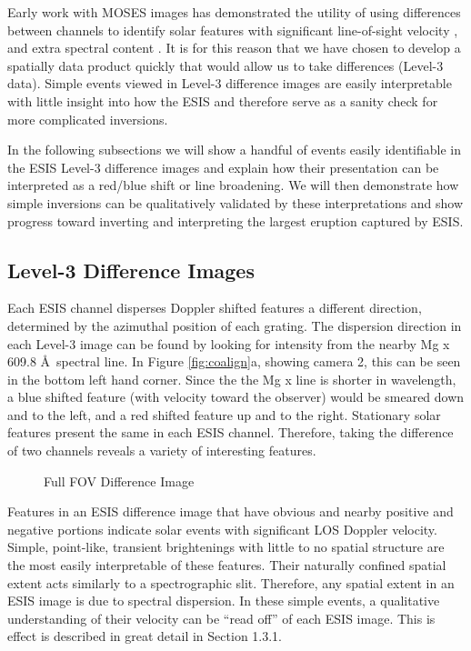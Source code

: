 	Early work with MOSES images has demonstrated the utility of using differences between channels to identify solar features with significant line-of-sight velocity \citep{Fox2010,FoxPhD,RustPhD,Rust2019}, and extra spectral content \citep{RustPhD, Rust2019,Parker2021}.  
	It is for this reason that we have chosen to develop a spatially data product quickly that would allow us to take differences (Level-3 data).  
	Simple events viewed in Level-3 difference images are easily interpretable with little insight into how the ESIS and therefore serve as a sanity check for more complicated inversions. 
	
	In the following subsections we will show a handful of events easily identifiable in the ESIS Level-3 difference images and explain how their presentation can be interpreted as a red/blue shift or line broadening.  
	We will then demonstrate how simple inversions can be qualitatively validated by these interpretations and show progress toward inverting and interpreting the largest eruption captured by ESIS.
	
    \subsection{Level-3 Difference Images}
    
    	Each ESIS channel disperses Doppler shifted features a different direction, determined by the azimuthal position of each grating.
    	The dispersion direction in each Level-3 image can be found by looking for intensity from the nearby Mg {\sc x} 609.8 \AA \ spectral line.
    	In Figure \ref{fig:coalign}a, showing camera 2, this can be seen in the bottom left hand corner.  
   		Since the the Mg {\sc x} line is shorter in wavelength, a blue shifted feature (with velocity toward the observer) would be smeared down and to the left, and a red shifted feature up and to the right.	
   		Stationary solar features present the same in each ESIS channel.
   		Therefore, taking the difference of two channels reveals a variety of interesting features.
   		
   		\begin{figure}[htb!]
   			\centering
   			\caption{Full FOV Difference Image}
   			\label{fig:l3_dif}
   		\end{figure}

    	Features in an ESIS difference image that have obvious and nearby positive and negative portions indicate solar events with significant LOS Doppler velocity.
    	Simple, point-like, transient brightenings with little to no spatial structure are the most easily interpretable of these features.
    	Their naturally confined spatial extent acts similarly to a spectrographic slit.
    	Therefore, any spatial extent in an ESIS image is due to spectral dispersion.
    	In these simple events, a qualitative understanding of their velocity can be ``read off'' of each ESIS image.
    	This is effect is described in great detail in \citet{Rust2019} Section 1.3.1. 
    	
